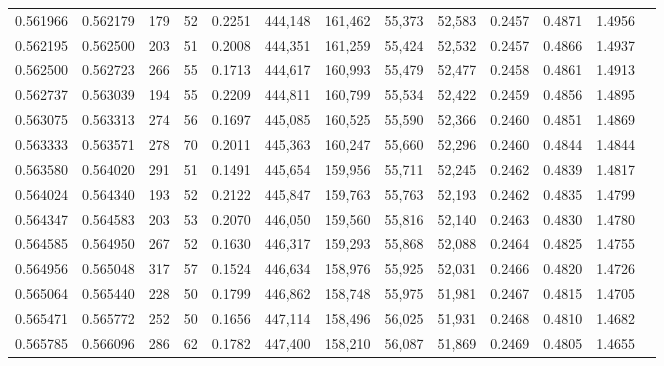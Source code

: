 \begin{tabular}{rrrrrrrrrrrrr}
0.561966 & 0.562179 &    179 &    52 &                                     0.2251 & 444,148 & 161,462 &  55,373 &  52,583 & 0.2457 & 0.4871 & 1.4956 \\
0.562195 & 0.562500 &    203 &    51 &                                     0.2008 & 444,351 & 161,259 &  55,424 &  52,532 & 0.2457 & 0.4866 & 1.4937 \\
0.562500 & 0.562723 &    266 &    55 &                                     0.1713 & 444,617 & 160,993 &  55,479 &  52,477 & 0.2458 & 0.4861 & 1.4913 \\
0.562737 & 0.563039 &    194 &    55 &                                     0.2209 & 444,811 & 160,799 &  55,534 &  52,422 & 0.2459 & 0.4856 & 1.4895 \\
0.563075 & 0.563313 &    274 &    56 &                                     0.1697 & 445,085 & 160,525 &  55,590 &  52,366 & 0.2460 & 0.4851 & 1.4869 \\
0.563333 & 0.563571 &    278 &    70 &                                     0.2011 & 445,363 & 160,247 &  55,660 &  52,296 & 0.2460 & 0.4844 & 1.4844 \\
0.563580 & 0.564020 &    291 &    51 &                                     0.1491 & 445,654 & 159,956 &  55,711 &  52,245 & 0.2462 & 0.4839 & 1.4817 \\
0.564024 & 0.564340 &    193 &    52 &                                     0.2122 & 445,847 & 159,763 &  55,763 &  52,193 & 0.2462 & 0.4835 & 1.4799 \\
0.564347 & 0.564583 &    203 &    53 &                                     0.2070 & 446,050 & 159,560 &  55,816 &  52,140 & 0.2463 & 0.4830 & 1.4780 \\
0.564585 & 0.564950 &    267 &    52 &                                     0.1630 & 446,317 & 159,293 &  55,868 &  52,088 & 0.2464 & 0.4825 & 1.4755 \\
0.564956 & 0.565048 &    317 &    57 &                                     0.1524 & 446,634 & 158,976 &  55,925 &  52,031 & 0.2466 & 0.4820 & 1.4726 \\
0.565064 & 0.565440 &    228 &    50 &                                     0.1799 & 446,862 & 158,748 &  55,975 &  51,981 & 0.2467 & 0.4815 & 1.4705 \\
0.565471 & 0.565772 &    252 &    50 &                                     0.1656 & 447,114 & 158,496 &  56,025 &  51,931 & 0.2468 & 0.4810 & 1.4682 \\
0.565785 & 0.566096 &    286 &    62 &                                     0.1782 & 447,400 & 158,210 &  56,087 &  51,869 & 0.2469 & 0.4805 & 1.4655 \\

\end{tabular}
